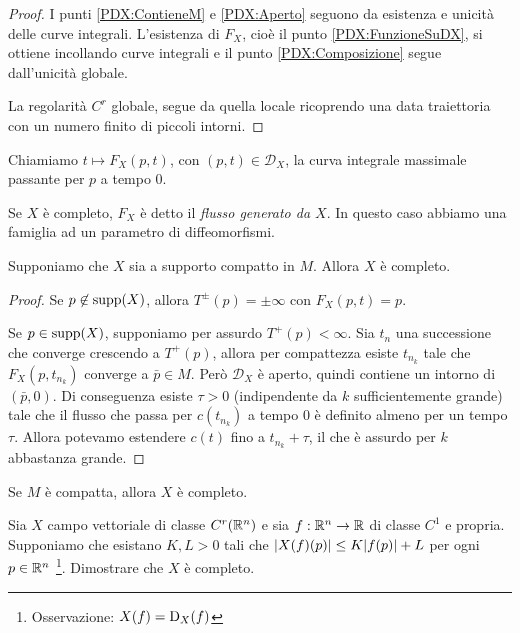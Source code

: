\begin{proof}
	I punti \ref{PDX:ContieneM} e \ref{PDX:Aperto} seguono da esistenza e unicità delle curve integrali. L'esistenza di $F_X$, cioè il punto \ref{PDX:FunzioneSuDX}, si ottiene incollando curve integrali e il punto \ref{PDX:Composizione} segue dall'unicità globale.
	
	La regolarità $C^r$ globale, segue da quella locale ricoprendo una data traiettoria con un numero finito di piccoli intorni.
\end{proof}

\begin{definition} 
	Chiamiamo $t\mapsto F_X(p,t)$, con $(p,t)\in\mathcal D_X$, la curva integrale massimale passante per $p$ a tempo 0.
	
	Se $X$ è completo, $F_X$ è detto il \emph{flusso generato da $X$}. In questo caso abbiamo una famiglia ad un parametro di diffeomorfismi.
\end{definition}

\begin{proposition}
	Supponiamo che $X$ sia a supporto compatto in $M$. Allora $X$ è completo.
\end{proposition}

\begin{proof}
	Se $p\not \in\operatorname{supp} (X)$, allora $T^{\pm}(p)=\pm\infty$ con $F_X(p,t)=p$.
	
	Se $p\in\operatorname{supp}(X)$, supponiamo per assurdo $T^+(p)<\infty$. Sia $t_n$ una successione che converge crescendo a $T^+(p)$, allora per compattezza esiste $t_{n_k}$ tale che $F_X(p,t_{n_k})$ converge a $\bar p\in M$.
	Però $\mathcal D_X$ è aperto, quindi contiene un intorno di $(\bar p,0)$.
	Di conseguenza esiste $\tau >0$ (indipendente da $k$ sufficientemente grande) tale che il flusso che passa per $c(t_{n_k})$ a tempo 0 è definito almeno per un tempo $\tau$.
	Allora potevamo estendere $c(t)$ fino a $t_{n_k}+\tau$, il che è assurdo per $k$ abbastanza grande.
\end{proof}


\begin{corollary}
	Se $M$ è compatta, allora $X$ è completo.
\end{corollary}


\begin{exercise}
	Sia $X$ campo vettoriale di classe $C^r(\mathbb R^n)$ e sia $f:\mathbb R^n\to \mathbb R$ di classe $C^1$ e propria. Supponiamo che esistano $K,L>0$ tali che $\lvert X(f)(p)\rvert\le K\lvert f(p)\rvert+L$ per ogni $p\in\mathbb R^n$ \footnote{Osservazione: $X(f)=\mathrm D_X(f)$}. Dimostrare che $X$ è completo.
\end{exercise}
